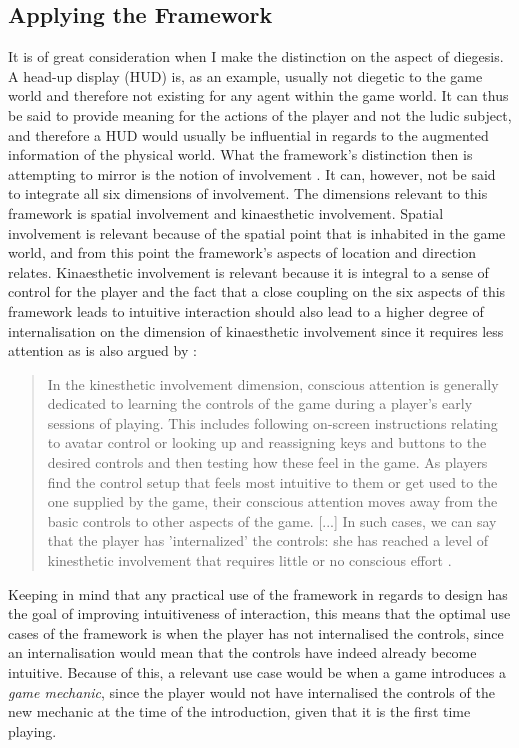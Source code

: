 \subsection{Applying the Framework}
It is of great consideration when I make the distinction on the aspect of diegesis. A head-up display (HUD) is, as an example, usually not diegetic to the game world and therefore not existing for any agent within the game world. It can thus be said to provide meaning for the actions of the player and not the ludic subject, and therefore a HUD would usually be influential in regards to the augmented information of the physical world. What the framework's distinction then is attempting to mirror is the notion of involvement . It can, however, not be said to integrate all six dimensions of involvement. The dimensions relevant to this framework is spatial involvement and kinaesthetic involvement. Spatial involvement is relevant because of the spatial point that is inhabited in the game world, and from this point the framework's aspects of location and direction relates. Kinaesthetic involvement is relevant because it is integral to a sense of control for the player and the fact that a close coupling on the six aspects of this framework leads to intuitive interaction \cite{frogger} should also lead to a higher degree of internalisation on the dimension of kinaesthetic involvement since it requires less attention as is also argued by \cite{calleja}:
\begin{quote}
  In the kinesthetic involvement dimension, conscious attention is generally dedicated to learning the controls of the game during a player’s early sessions of playing. This includes following on-screen instructions relating to avatar control or looking up and reassigning keys and buttons to the desired controls and then testing how these feel in the game. As players find the control setup that feels most intuitive to them or get used to the one supplied by the game, their conscious attention moves away from the basic controls to other aspects of the game. [...] In such cases, we can say that the player has 'internalized' the controls: she has reached a level of kinesthetic involvement that requires little or no conscious effort \cite[p. 45]{calleja}.
\end{quote}
Keeping in mind that any practical use of the framework in regards to design has the goal of improving intuitiveness of interaction, this means that the optimal use cases of the framework is when the player has not internalised the controls, since an internalisation would mean that the controls have indeed already become intuitive. Because of this, a relevant use case would be when a game introduces a \textit{game mechanic}, since the player would not have internalised the controls of the new mechanic at the time of the introduction, given that it is the first time playing.

